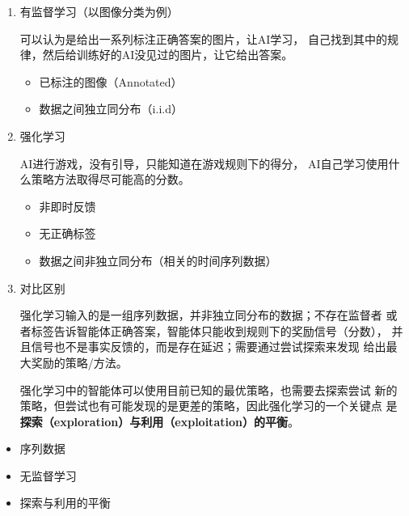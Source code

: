 \begin{enumerate}[
  label=（\arabic*）,
  labelindent=\parindent,
  labelwidth=!,
  leftmargin=*,
  labelsep=0.4em,
  parsep=0.5em
]
  \item 有监督学习（以图像分类为例）
  
  \begin{itemparagraph}
  可以认为是给出一系列标注正确答案的图片，让AI学习，
  自己找到其中的规律，然后给训练好的AI没见过的图片，让它给出答案。
  \end{itemparagraph}

  \begin{itemize}
    \item 已标注的图像（Annotated）
    \item 数据之间独立同分布（i.i.d）
  \end{itemize}
  \item 强化学习
  
  \begin{itemparagraph}
  AI进行游戏，没有引导，只能知道在游戏规则下的得分，
  AI自己学习使用什么策略方法取得尽可能高的分数。
  \end{itemparagraph}

  \begin{itemize}
    \item 非即时反馈
    \item 无正确标签
    \item 数据之间非独立同分布（相关的时间序列数据）
  \end{itemize}

  \item 对比区别
  
  \begin{itemparagraph}
  强化学习输入的是一组序列数据，并非独立同分布的数据；不存在监督者
  或者标签告诉智能体正确答案，智能体只能收到规则下的奖励信号（分数），
  并且信号也不是事实反馈的，而是存在延迟；需要通过尝试探索来发现
  给出最大奖励的策略/方法。

  强化学习中的智能体可以使用目前已知的最优策略，也需要去探索尝试
  新的策略，但尝试也有可能发现的是更差的策略，因此强化学习的一个关键点
  是\textbf{探索（exploration）与利用（exploitation）的平衡}。
  \end{itemparagraph}
\end{enumerate}

\begin{keybox}[强化学习特点]
  \begin{itemize}
    \item 序列数据
    \item 无监督学习
    \item 探索与利用的平衡
  \end{itemize}
\end{keybox}

